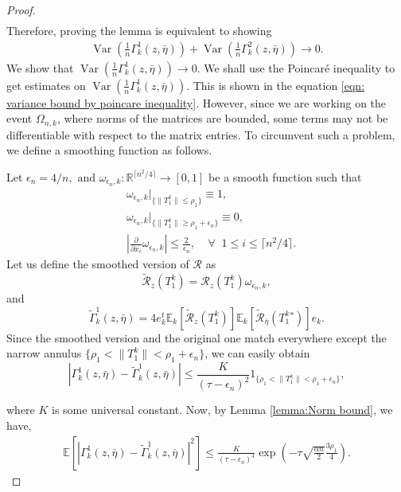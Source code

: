 \documentclass[12pt]{amsart}
\theoremstyle{plain}
\theoremstyle{definition}
\newcommand{\conjugate}{{\operatorname{^*}}}
\newcommand{\Var}{\operatorname{Var}}
\begin{document}
\begin{proof}
\begin{align}
\end{align}
Therefore, proving the lemma is equivalent to showing
\begin{align*}
    \Var\left(\frac{1}{n}\Gamma_{k}^1(z,\bar{\eta})\right)+\Var\left(\frac{1}{n}\Gamma_{k}^2(z,\bar{\eta})\right) \rightarrow 0.
\end{align*}
We show that $\Var\left(\frac{1}{n}\Gamma_{k}^1(z,\bar{\eta})\right) \rightarrow 0.$ We shall use the Poincar\'e inequality to get estimates on $\Var\left(\frac{1}{n}\Gamma_{k}^1(z,\bar{\eta})\right).$ This is shown in the equation \eqref{eqn: variance bound by poincare inequality}. However, since we are working on the event $\Omega_{n, k}$, where norms of the matrices are bounded, some terms may not be differentiable with respect to the matrix entries. To circumvent such a problem, we define a smoothing function as follows.


Let $\epsilon_n= 4/n, \text{ and } \omega_{\epsilon_n,k}:\mathbb{R}^{\lceil n^2/4 \rceil} \rightarrow [0,1]$ be a smooth function such that 
\begin{align*}
&\omega_{\epsilon_n,k}|_{\{\|T_1^k\|\leq \rho_1\}} \equiv 1, \\
&\omega_{\epsilon_n,k}|_{\{\|T_1^k\|\geq \rho_1+\epsilon_n\}} \equiv 0,\\
&\left|\frac{\partial}{\partial x_{i}}\omega_{\epsilon_n,k}\right| \leq \frac{2}{\epsilon_n}, \;\;\;\; \forall \;\; 1\leq i \leq \lceil n^{2}/4\rceil.
\end{align*}
Let us define the smoothed version of $\mathcal{R}$ as $$\tilde{\mathcal{R}}_z(T_1^k)=\mathcal{R}_{z}(T_1^k)\omega_{\epsilon_n,k},$$
and
$$
\tilde{\Gamma}_{k}^1(z,\bar{\eta}) =4e_k^t \mathbb{E}_k [\tilde{\mathcal{R}}_z(T_1^k)]\mathbb{E}_k [\tilde{\mathcal{R}}_{\bar{\eta}}(T_1^k\conjugate)]e_k.
$$
Since the smoothed version and the original one match everywhere except the narrow annulus $\{\rho_1<\|T_1^k\|<\rho_1+\epsilon_n\}$, we can easily obtain
$$
|\Gamma_{k}^1(z,\bar{\eta})-\tilde{\Gamma}_{k}^1(z,\bar{\eta})| \leq\frac{K}{(\tau - \epsilon_n)^2}1_{\{\rho_1<\|T_1^k\|<\rho_1+\epsilon_n\}},
$$

where $K$ is some universal constant. Now, by Lemma \ref{lemma:Norm bound}, we have, 
\begin{align}
    \mathbb{E}[|\Gamma_{k}^1(z,\bar{\eta})-\tilde\Gamma_{k}^1(z,\bar{\eta})|^2] \leq \frac{K}{(\tau - \epsilon_n)^4}  \exp{\left(-\tau \sqrt{\frac{\alpha n}{2}}\frac{3\rho_1}{4}\right)}.\label{eqn: diff between Gamma and tilde Gamma}
\end{align}


\end{proof}
\end{document}
